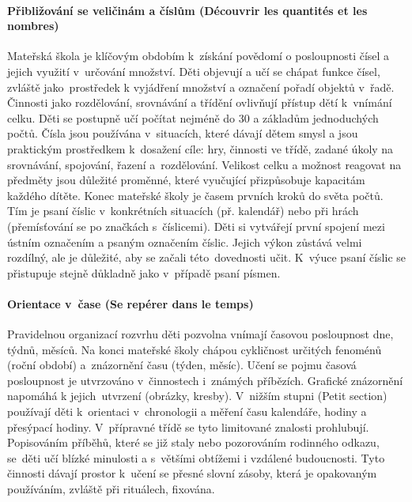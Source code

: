 			\paragraph{Přibližování se veličinám a číslům (Découvrir les quantités et les nombres)}
				Mateřská škola je klíčovým obdobím k získání povědomí o posloupnosti čísel a jejich využití v určování množství. Děti objevují a učí se chápat funkce čísel, zvláště jako prostředek k vyjádření množství a označení pořadí objektů v řadě.
				Činnosti jako rozdělování, srovnávání a třídění ovlivňují přístup dětí k vnímání celku. Děti se postupně učí počítat nejméně do 30 a základům jednoduchých počtů.
				Čísla jsou používána v situacích, které dávají dětem smysl a jsou praktickým prostředkem k dosažení cíle: hry, činnosti ve třídě, zadané úkoly na srovnávání, spojování, řazení a rozdělování. Velikost celku a možnost reagovat na předměty jsou důležité proměnné, které vyučující přizpůsobuje kapacitám každého dítěte. 
				Konec mateřské školy je časem prvních kroků do světa počtů. 
				Tím je psaní číslic v konkrétních situacích (př. kalendář) nebo při hrách (přemísťování se po značkách s číslicemi). Děti si vytvářejí první spojení mezi ústním označením a psaným označením číslic. Jejich výkon zůstává velmi rozdílný, ale je důležité, aby se začali této dovednosti učit. K výuce psaní číslic se přistupuje stejně důkladně jako v případě psaní písmen.
			\paragraph{Orientace v čase (Se repérer dans le temps)}
				Pravidelnou organizací rozvrhu děti pozvolna vnímají časovou posloupnost dne, týdnů, měsíců. Na konci mateřské školy chápou cykličnost určitých fenoménů (roční období) a znázornění času (týden, měsíc). Učení se pojmu časová posloupnost je utvrzováno v činnostech i známých příbězích. Grafické znázornění napomáhá k jejich utvrzení (obrázky, kresby).
				V nižším stupni (Petit section) používají děti k orientaci v chronologii a měření času kalendáře, hodiny a přesýpací hodiny. V přípravné třídě se tyto limitované znalosti prohlubují. Popisováním příběhů, které se již staly nebo pozorováním rodinného odkazu, se děti učí blízké minulosti a s většími obtížemi i vzdálené budoucnosti.
				Tyto činnosti dávají prostor k učení se přesné slovní zásoby, která je opakovaným používáním, zvláště při rituálech, fixována.
